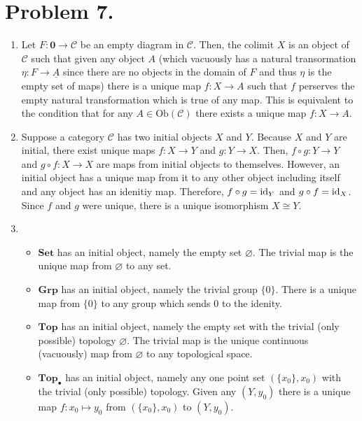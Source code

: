 \documentclass[12pt]{extarticle}
\begin{document}
\section*{Problem 7.}

\begin{enumerate}
\item Let $F : \mathbf{0} \to \mathcal{C}$ be an empty diagram in $\mathcal{C}$. Then, the colimit $X$ is an object of $\mathcal{C}$ such that given any object $A$ (which vacuously has a natural transormation $\eta : F \to \underline{A}$ since there are no objects in the domain of $F$ and thus $\eta$ is the empty set of maps) there is a unique map $f : X \to A$ such that $f$ perserves the empty natural transformation which is true of any map. This is equivalent to the condition that for any $A \in \mathrm{Ob}(\mathcal{C})$ there exists a unique map $f : X \to A$. 

\item Suppose a category $\mathcal{C}$ has two initial objects $X$ and $Y$. Because $X$ and $Y$ are initial, there exist unique maps $f : X \to Y$ and $g : Y \to X$. Then, $f \circ g : Y \to Y$ and $g \circ f : X \to X$ are maps from initial objects to themselves. However, an initial object has a unique map from it to any other object including itself and any object has an idenitiy map. Therefore, $f \circ g = \mathrm{id}_Y$ and $g \circ f = \mathrm{id}_X$. Since $f$ and $g$ were unique, there is a unique isomorphism $X \cong Y$. 
\item 
\begin{itemize}
\item $\mathbf{Set}$ has an initial object, namely the empty set $\varnothing$. The trivial map is the unique map from $\varnothing$ to any set. 

\item $\mathbf{Grp}$ has an initial object, namely the trivial group $\{0\}$. There is a unique map from $\{0\}$ to any group which sends $0$ to the idenity.

\item $\mathbf{Top}$ has an initial object, namely the empty set with the trivial (only possible) topology $\varnothing$. The trivial map is the unique continuous (vacuously) map from $\varnothing$ to any topological space.

\item $\mathbf{Top}_\bullet$ has an initial object, namely any one point set $(\{x_0\}, x_0)$ with the trivial (only possible) topology. Given any $(Y, y_0)$ there is a unique map $f : x_0 \mapsto y_0$ from $(\{x_0\}, x_0)$ to $(Y, y_0)$.


\end{itemize}
\end{enumerate}
\end{document}
